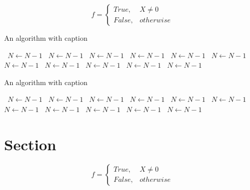 \documentclass[a4paper]{article}
\begin{document}
\begin{equation}   f =
\begin{cases} True, & X \neq 0\\
False, & otherwise
\end{cases}
\end{equation}

\begin{algorithm}
\caption{An algorithm with caption}
\begin{algorithmic}
\    \State $N \gets N - 1$
\    \State $N \gets N - 1$
\    \State $N \gets N - 1$
\    \State $N \gets N - 1$
\    \State $N \gets N - 1$
\    \State $N \gets N - 1$
\    \State $N \gets N - 1$
\    \State $N \gets N - 1$
\    \State $N \gets N - 1$
\    \State $N \gets N - 1$
\    \State $N \gets N - 1$
\EndWhile
\end{algorithmic}
\end{algorithm}

\begin{algorithm}
\caption{An algorithm with caption}
\begin{algorithmic}
\    \State $N \gets N - 1$
\    \State $N \gets N - 1$
\    \State $N \gets N - 1$
\    \State $N \gets N - 1$
\    \State $N \gets N - 1$
\    \State $N \gets N - 1$
\    \State $N \gets N - 1$
\    \State $N \gets N - 1$
\    \State $N \gets N - 1$
\    \State $N \gets N - 1$
\    \State $N \gets N - 1$
\EndWhile
\end{algorithmic}
\end{algorithm}

\section{Section}

\begin{equation}   f =
\begin{cases} True, & X \neq 0\\
False, & otherwise
\end{cases}
\end{equation}
\end{document}
